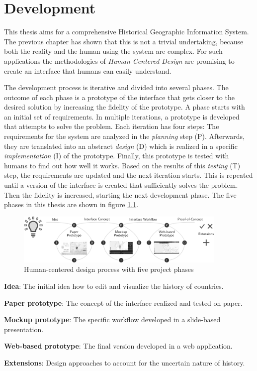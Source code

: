 
\chapter{Development} %
\label{cha:development}

This thesis aims for a comprehensive Historical Geographic Information System. The previous chapter has shown that this is not a trivial undertaking, because both the reality and the human using the system are complex. For such applications the methodologies of \emph{Human-Centered Design} are promising to create an interface that humans can easily understand.

The development process is iterative and divided into several phases. The outcome of each phase is a prototype of the interface that gets closer to the desired solution by increasing the fidelity of the prototype. A phase starts with an initial set of requirements. In multiple iterations, a prototype is developed that attempts to solve the problem. Each iteration has four steps: The requirements for the system are analyzed in the \emph{planning} step (P). Afterwards, they are translated into an abstract \emph{design} (D) which is realized in a specific \emph{implementation} (I) of the prototype. Finally, this prototype is tested with humans to find out how well it works. Based on the results of this \emph{testing} (T) step, the requirements are updated and the next iteration starts. This is repeated until a version of the interface is created that sufficiently solves the problem. Then the fidelity is increased, starting the next development phase. The five phases in this thesis are shown in figure \ref{fig:human_centered_design}.

\begin{figure}[H]
  \vspace{1.5em}
  \centering
  \includegraphics[width=0.9\textwidth]{graphics/development/human_centered_design}
  \caption{Human-centered design process with five project phases}
  \label{fig:human_centered_design}
\end{figure}

\begin{compactenum}
  \item \textbf{Idea}: The initial idea how to edit and visualize the history of countries.
  \item \textbf{Paper prototype}: The concept of the interface realized and tested on paper.
  \item \textbf{Mockup prototype}: The specific workflow developed in a slide-based presentation.
  \item \textbf{Web-based prototype}: The final version developed in a web application.
  \item \textbf{Extensions}: Design approaches to account for the uncertain nature of history.
\end{compactenum}


